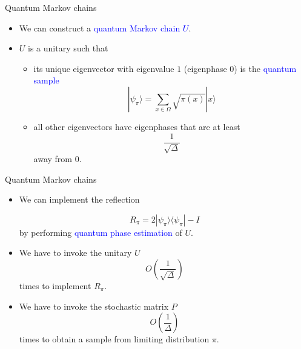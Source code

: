 \documentclass{beamer}
\renewcommand{\>}{\rangle}
\newcommand{\<}{\langle}
\begin{document}
\begin{frame}{Quantum Markov chains}
    \begin{itemize}
        \item We can construct a \textcolor{blue}{quantum Markov chain $U$}.
        
        \medskip
        \item $U$ is a unitary such that
        
        \medskip
        \begin{itemize}
            \item its unique eigenvector with eigenvalue $1$ (eigenphase $0$) is the \textcolor{blue}{quantum sample}
            \begin{equation*}
                |\psi_\pi\> = \sum_{x\in\Omega} \sqrt{\pi(x)} |x\>
            \end{equation*}
            
            \medskip
            \item all other eigenvectors have eigenphases that are at least
            \begin{equation*}
                \frac{1}{\sqrt{\Delta}}
            \end{equation*}
            away from $0$.
        \end{itemize}
    \end{itemize}
\end{frame}

%

\begin{frame}{Quantum Markov chains}
    \begin{itemize}
        \item We can implement the reflection 
        
        \begin{equation*}
            R_\pi = 2|\psi_\pi\>\<\psi_\pi|-I
        \end{equation*}
        by performing \textcolor{blue}{quantum phase estimation} of $U$.
        
        \medskip
        \item We have to invoke the unitary $U$
        \begin{equation*}
            O\left(
            \frac{1}{\sqrt{\Delta}}
            \right)
        \end{equation*}
        times to implement $R_\pi$.
        
        \medskip
        \item We have to invoke the stochastic matrix $P$
        \begin{equation*}
            O\left(
            \frac{1}{\Delta}
            \right)
        \end{equation*}
        times to obtain a sample from limiting distribution $\pi$.
    \end{itemize}
\end{frame}

%
\end{document}
